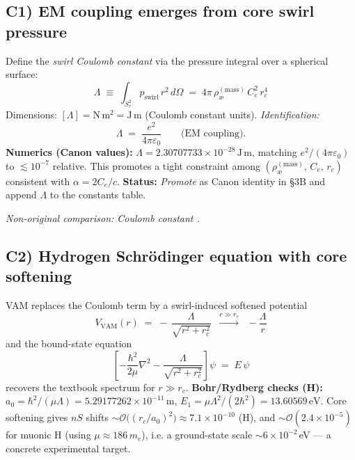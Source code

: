 \documentclass[11pt,a4paper]{article}
\begin{document}
    \subsection*{C1) EM coupling emerges from core swirl pressure}
    \label{subsec:coulomb-from-swirl}

    Define the \emph{swirl Coulomb constant} via the pressure integral over a spherical surface:
    \[
        \boxed{ \Lambda \;\equiv\; \int_{S_r^2} p_{\text{swirl}}\,r^2\,d\Omega
        \;=\; 4\pi\,\rho_{\text{\ae}}^{(\text{mass})}\,C_e^2\,r_c^4 }
    \]
    Dimensions: $[\Lambda]=\mathrm{N\,m^2}=\mathrm{J\,m}$ (Coulomb constant units).
    \emph{Identification:}
    \[
        \boxed{ \Lambda \;=\; \frac{e^2}{4\pi\varepsilon_0} } \qquad \text{(EM coupling).}
    \]
    \textbf{Numerics (Canon values):} $\Lambda=2.30707733\times10^{-28}\,\mathrm{J\,m}$, matching $e^2/(4\pi\varepsilon_0)$ to $\lesssim10^{-7}$ relative.
    This promotes a tight constraint among $(\rho_{\text{\ae}}^{(\text{mass})},\,C_e,\,r_c)$ consistent with $\alpha = 2C_e/c$.
    \textbf{Status:} \emph{Promote} as Canon identity in \S3B and append $\Lambda$ to the constants table.

    \textit{Non-original comparison: Coulomb constant \cite{Jackson1999}.}

    \subsection*{C2) Hydrogen Schr\"odinger equation with core softening}
    \label{subsec:hydrogen-soft-core}

    VAM replaces the Coulomb term by a swirl-induced softened potential
    \[
        \boxed{ V_{\text{VAM}}(r) \;=\; -\,\frac{\Lambda}{\sqrt{r^2+r_c^2}}
        \;\;\xrightarrow{r\gg r_c}\;\; -\frac{\Lambda}{r} }
    \]
    and the bound-state equation
    \[
        \boxed{ \left[-\frac{\hbar^2}{2\mu}\nabla^2 - \frac{\Lambda}{\sqrt{r^2+r_c^2}}\right]\psi \;=\; E\,\psi }
    \]
    recovers the textbook spectrum for $r\gg r_c$.
    \textbf{Bohr/Rydberg checks (H):}
    $a_0=\hbar^2/(\mu\Lambda)=5.29177262\times10^{-11}\,\mathrm{m}$,
    $E_{1}=\mu\Lambda^2/(2\hbar^2)=13.60569\,\mathrm{eV}$.
    Core softening gives $nS$ shifts $\sim \mathcal{O}\!\big((r_c/a_0)^2\big)\approx 7.1\times10^{-10}$ (H), and
    $\sim \mathcal{O}(2.4\times10^{-5})$ for muonic H (using $\mu\approx 186\,m_e$),
    i.e. a ground-state scale $\sim 6\times10^{-2}$\,eV --- a concrete experimental target.
\end{document}
